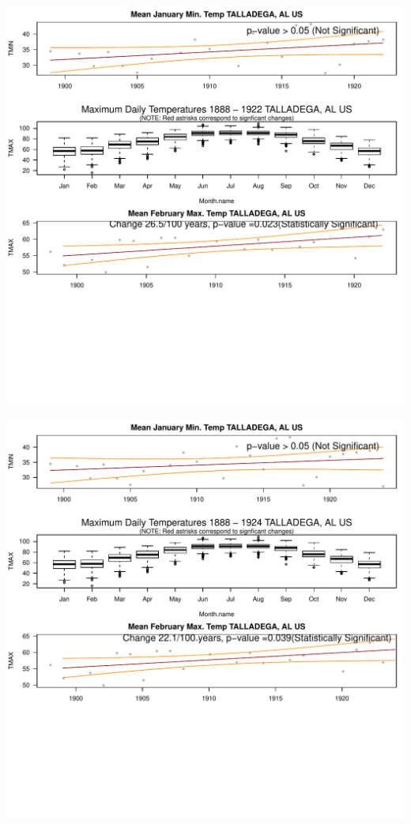 \documentclass{article}\usepackage[]{graphicx}\usepackage[]{color}
\makeatletter
\def\maxwidth{ %
  \ifdim\Gin@nat@width>\linewidth
    \linewidth
  \else
    \Gin@nat@width
  \fi
}
\newenvironment{knitrout}{}{} %
\makeatother
\begin{document}
\begin{knitrout}
\includegraphics[width=\maxwidth]{figure/static_template-7} 

\includegraphics[width=\maxwidth]{figure/static_template-8} 


\end{knitrout}
\end{document}
